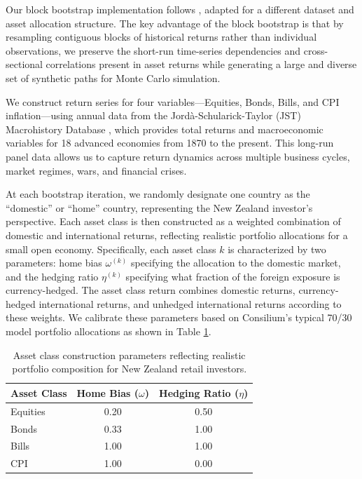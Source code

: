 \documentclass[11pt]{article}
\begin{document}
Our block bootstrap implementation follows \textcite{anarkulova2025beyond}, adapted for a different dataset and asset allocation structure. The key advantage of the block bootstrap is that by resampling contiguous blocks of historical returns rather than individual observations, we preserve the short-run time-series dependencies and cross-sectional correlations present in asset returns while generating a large and diverse set of synthetic paths for Monte Carlo simulation.

We construct return series for four variables---Equities, Bonds, Bills, and CPI inflation---using annual data from the Jordà-Schularick-Taylor (JST) Macrohistory Database \parencite{jorda2017macrofinancial}, which provides total returns and macroeconomic variables for 18 advanced economies from 1870 to the present. This long-run panel data allows us to capture return dynamics across multiple business cycles, market regimes, wars, and financial crises.

At each bootstrap iteration, we randomly designate one country as the ``domestic'' or ``home'' country, representing the New Zealand investor's perspective. Each asset class is then constructed as a weighted combination of domestic and international returns, reflecting realistic portfolio allocations for a small open economy. Specifically, each asset class $k$ is characterized by two parameters: home bias $\omega^{(k)}$ specifying the allocation to the domestic market, and the hedging ratio $\eta^{(k)}$ specifying what fraction of the foreign exposure is currency-hedged. The asset class return combines domestic returns, currency-hedged international returns, and unhedged international returns according to these weights. We calibrate these parameters based on Consilium's typical 70/30 model portfolio allocations as shown in Table \ref{tab:asset_class_params}. 

\begin{table}[h!]
\centering
\begin{tabular}{lcc}
\toprule
\textbf{Asset Class} & \textbf{Home Bias} ($\omega$) & \textbf{Hedging Ratio} ($\eta$) \\
\midrule
Equities & 0.20 & 0.50 \\
Bonds & 0.33 & 1.00 \\
Bills & 1.00 & 1.00 \\
CPI & 1.00 & 0.00 \\
\bottomrule
\end{tabular}
\caption{Asset class construction parameters reflecting realistic portfolio composition for New Zealand retail investors.}
\label{tab:asset_class_params}
\end{table}
\end{document}
